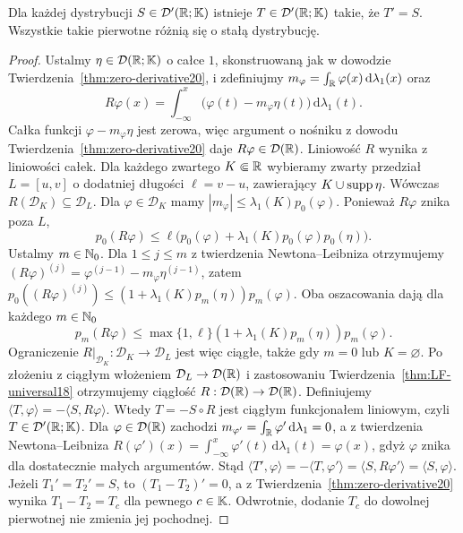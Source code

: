 \begin{twierdzenie}
\label{thm:primitive20}
Dla każdej dystrybucji $S\in\mathcal D'(\mathbb R;\mathbb K)$
istnieje $T\in\mathcal D'(\mathbb R;\mathbb K)$ takie, że $T'=S$.
Wszystkie takie pierwotne różnią się o stałą dystrybucję.
\end{twierdzenie}
\begin{proof}
Ustalmy $\eta\in\mathcal D(\mathbb R;\mathbb K)$ o całce $1$,
skonstruowaną jak w dowodzie
Twierdzenia~\ref{thm:zero-derivative20}, i
zdefiniujmy $m_\varphi=\int_\mathbb R\varphi(x)\,\mathrm d\lambda_1(x)$
oraz
\[
 R\varphi(x)=\int_{-\infty}^x
 \bigl(\varphi(t)-m_\varphi\eta(t)\bigr)\,\mathrm d\lambda_1(t).
\]
Całka funkcji $\varphi-m_\varphi\eta$ jest zerowa,
więc argument o nośniku z dowodu
Twierdzenia~\ref{thm:zero-derivative20} daje
$R\varphi\in\mathcal D(\mathbb R)$.
Liniowość $R$ wynika z liniowości całek.
Dla każdego zwartego $K\Subset\mathbb R$ wybieramy zwarty przedział
$L=[u,v]$ o dodatniej długości $\ell=v-u$, zawierający
$K\cup\operatorname{supp}\eta$. Wówczas $R(\mathcal D_K)\subseteq\mathcal D_L$.
Dla $\varphi\in\mathcal D_K$ mamy
$|m_\varphi|\le\lambda_1(K)p_0(\varphi)$.
Ponieważ $R\varphi$ znika poza $L$,
\[
p_0(R\varphi)\le\ell\bigl(p_0(\varphi)
+\lambda_1(K)p_0(\varphi)p_0(\eta)\bigr).
\]
Ustalmy $m\in\mathbb N_0$. Dla $1\le j\le m$ z twierdzenia Newtona--Leibniza
otrzymujemy $(R\varphi)^{(j)}=\varphi^{(j-1)}
-m_\varphi\eta^{(j-1)}$, zatem
$p_0((R\varphi)^{(j)})\le
(1+\lambda_1(K)p_m(\eta))p_m(\varphi)$.
Oba oszacowania dają dla każdego $m\in\mathbb N_0$
\[
p_m(R\varphi)\le
\max\{1,\ell\}(1+\lambda_1(K)p_m(\eta))p_m(\varphi).
\]
Ograniczenie $R|_{\mathcal D_K}:\mathcal D_K\to\mathcal D_L$
jest więc ciągłe, także gdy $m=0$ lub $K=\varnothing$.
Po złożeniu z ciągłym włożeniem $\mathcal D_L\to\mathcal D(\mathbb R)$
i zastosowaniu Twierdzenia~\ref{thm:LF-universal18}
otrzymujemy ciągłość $R:\mathcal D(\mathbb R)\to\mathcal D(\mathbb R)$.
Definiujemy
$\langle T,\varphi\rangle=-\langle S,R\varphi\rangle$.
Wtedy $T=-S\circ R$ jest ciągłym funkcjonałem liniowym,
czyli $T\in\mathcal D'(\mathbb R;\mathbb K)$.
Dla $\varphi\in\mathcal D(\mathbb R)$ zachodzi
$m_{\varphi'}=\int_\mathbb R\varphi'\,\mathrm d\lambda_1=0$,
a z twierdzenia Newtona--Leibniza
$R(\varphi')(x)=\int_{-\infty}^x\varphi'(t)\,
\mathrm d\lambda_1(t)=\varphi(x)$, gdyż $\varphi$ znika
dla dostatecznie małych argumentów.
Stąd
$\langle T',\varphi\rangle=-\langle T,\varphi'\rangle
=\langle S,R\varphi'\rangle=\langle S,\varphi\rangle$.
Jeżeli $T_1'=T_2'=S$, to $(T_1-T_2)'=0$, a z
Twierdzenia~\ref{thm:zero-derivative20} wynika $T_1-T_2=T_c$
dla pewnego $c\in\mathbb K$. Odwrotnie, dodanie $T_c$ do
dowolnej pierwotnej nie zmienia jej pochodnej.
\end{proof}

